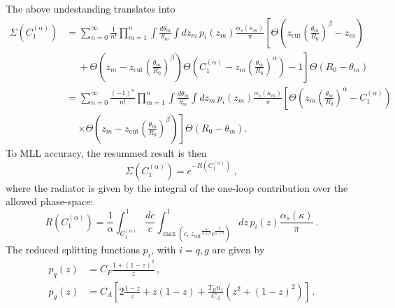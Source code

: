 \documentclass[letterpaper,11pt]{article}
\newcommand{\as}{\alpha_s}
\newcommand{\C}[2]{C^{(#2)}_{#1}}
\newcommand{\zcut}{z_\text{cut}}
\newcommand{\ea}{{\C{1}{\alpha}}}
\begin{document}
The above undestanding translates into
\begin{align}\label{all-order-ang-start}
\Sigma(\ea)&= \sum_{n=0}^{\infty}\frac{1}{n!} \prod_{m=1}^n 
\int \frac{d \theta_m}{\theta_m} \int d z_m\,  p_i(z_m) \frac{ \as(\kappa_{m})}{\pi} \left[
\Theta\left(\zcut \left(\frac{\theta_m}{R_0} \right)^\beta -z_m \right) \right. \nonumber \\ & \quad ~ + \left.
\Theta\left(z_m- \zcut \left(\frac{\theta_m}{R_0} \right)^\beta \right)
\Theta \left(\ea -z_m \left(\frac{\theta_m}{R_0} \right)^\alpha\right)-1
 \right] \Theta\left(R_0-\theta_m \right)
  \nonumber \\ &
   =\sum_{n=0}^{\infty}\frac{(-1)^n}{n!} \prod_{m=1}^n 
\int \frac{d \theta_m}{\theta_m} \int  d z_m\, p_i(z_m) \frac{ \as(\kappa_{m})}{\pi}  \left[
\Theta \left(z_m\left(\frac{\theta_m}{R_0} \right)^\alpha-\ea \right) \right. \nonumber \\ & \quad ~ \left. \times
\Theta\left(z_m-\zcut \left(\frac{\theta_m}{R_0} \right)^\beta\right) \right] \Theta\left(R_0-\theta_m \right).
\end{align}
To MLL accuracy, the resummed result is then
\begin{equation}
\Sigma(\ea) = e^{-R(\ea)} \ ,
\end{equation}
where the radiator is given by the integral of the one-loop contribution over the allowed phase-space:
\begin{equation}\label{rad-ang-end-app}
R(\ea)= \frac{1}{\alpha}\int_{\ea}^1 \frac{d c}{c} 
\int_{\max \left(c,\, {\zcut}^\frac{\alpha}{\alpha+\beta} {c}^\frac{\beta}{\alpha+\beta} \right) }^1 d z\, p_i(z)
\frac{\as\left(\kappa  \right)}{\pi}
  \ .
\end{equation}
The reduced splitting functions $p_i$, with $i=q,g$ are given by
\begin{subequations}
  \label{eq:reduced-splitting}
  \begin{align}
  p_{q}(z)& = C_F \frac{1+(1-z)^2}{z}\,,\\
 p_{g} (z)&= C_A\left[ 2\frac{1-z}{z} + z(1-z)+ \frac{T_R n_f}{C_A} (z^2 + (1-z)^2)\right]\,.
  \end{align}
\end{subequations}
\end{document}
